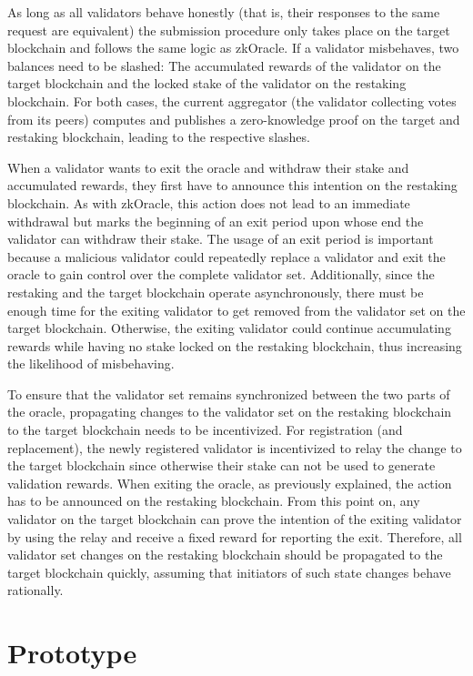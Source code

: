 \documentclass{article}
\begin{document}
	As long as all validators behave honestly (that is, their responses to the same request are equivalent) the submission procedure only takes place on the target blockchain and follows the same logic as zkOracle.
	If a validator misbehaves, two balances need to be slashed: The accumulated rewards of the validator on the target blockchain and the locked stake of the validator on the restaking blockchain.
	For both cases, the current aggregator (the validator collecting votes from its peers) computes and publishes a zero-knowledge proof on the target and restaking blockchain, leading to the respective slashes.
	
	When a validator wants to exit the oracle and withdraw their stake and accumulated rewards, they first have to announce this intention on the restaking blockchain.
	As with zkOracle, this action does not lead to an immediate withdrawal but marks the beginning of an exit period upon whose end the validator can withdraw their stake.
	The usage of an exit period is important because a malicious validator could repeatedly replace a validator and exit the oracle to gain control over the complete validator set.
	Additionally, since the restaking and the target blockchain operate asynchronously, there must be enough time for the exiting validator to get removed from the validator set on the target blockchain.
	Otherwise, the exiting validator could continue accumulating rewards while having no stake locked on the restaking blockchain, thus increasing the likelihood of misbehaving.
	
	To ensure that the validator set remains synchronized between the two parts of the oracle, propagating changes to the validator set on the restaking blockchain to the target blockchain needs to be incentivized.
	For registration (and replacement), the newly registered validator is incentivized to relay the change to the target blockchain since otherwise their stake can not be used to generate validation rewards.
	When exiting the oracle, as previously explained, the action has to be announced on the restaking blockchain.
	From this point on, any validator on the target blockchain can prove the intention of the exiting validator by using the relay and receive a fixed reward for reporting the exit.
	Therefore, all validator set changes on the restaking blockchain should be propagated to the target blockchain quickly, assuming that initiators of such state changes behave rationally.
	
	\section{Prototype}
	\label{sec:prototype}
	
\end{document}
